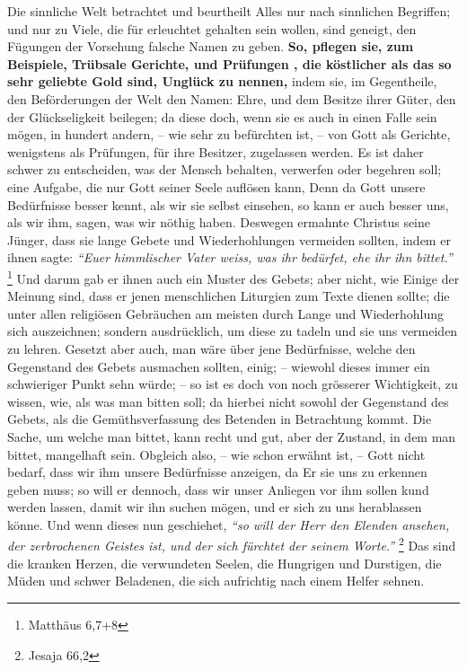 \medskip

Die sinnliche Welt betrachtet und beurtheilt Alles nur nach sinnlichen
Begriffen; und nur zu Viele, die für erleuchtet 
gehalten sein wollen, sind
geneigt, den Fügungen der Vorsehung falsche Namen zu geben. \textbf{So, pflegen
sie, zum
Beispiele, Trübsale Gerichte, und Prüfungen , die köstlicher
als das so sehr
geliebte Gold sind, Unglück  zu nennen,} indem sie, im
Gegentheile, den
Beförderungen der Welt den Namen: Ehre, und dem Besitze ihrer Güter, den der
Glückseligkeit  beilegen; da diese doch, wenn sie es auch
in einen Falle sein
mögen, in hundert andern, -- wie sehr zu befürchten ist, -- von Gott als
Gerichte, wenigstens als Prüfungen, für ihre Besitzer, zugelassen
werden. Es ist
daher schwer zu entscheiden, was der Mensch behalten, verwerfen oder begehren
soll; eine Aufgabe, die nur Gott seiner Seele auflösen
kann, Denn da Gott unsere
Bedürfnisse  besser kennt, als wir sie
selbst einsehen, so kann er auch besser
uns, als wir ihm, sagen, was wir nöthig haben. Deswegen ermahnte Christus seine
Jünger, dass sie lange Gebete und Wiederhohlungen vermeiden sollten, indem er
ihnen sagte:
\textit{"`Euer himmlischer Vater weiss, was ihr bedürfet, ehe ihr ihn
bittet."'}
\footnote{Matthäus 6,7+8}
Und darum gab er ihnen auch ein Muster des
Gebets; aber nicht, wie Einige der Meinung sind, dass er jenen menschlichen
Liturgien zum Texte dienen sollte; die unter allen religiösen Gebräuchen am
meisten durch Lange und Wiederhohlung sich auszeichnen; sondern ausdrücklich,
um diese zu tadeln und sie uns vermeiden zu lehren. Gesetzt aber auch, man wäre
über jene Bedürfnisse, welche den Gegenstand des Gebets ausmachen sollten,
einig; -- wiewohl dieses immer ein schwieriger Punkt sehn würde; -- so ist es
doch von noch grösserer Wichtigkeit, zu wissen, wie, als was man bitten soll; da
hierbei nicht sowohl der Gegenstand des Gebets, als die Gemüthsverfassung des
Betenden in Betrachtung kommt. Die Sache, um welche man bittet, kann recht und
gut, aber der Zustand, in dem man bittet, mangelhaft sein. Obgleich also, -- wie
schon erwähnt ist, -- Gott nicht bedarf, dass wir ihm unsere Bedürfnisse
anzeigen, da Er sie uns zu erkennen geben muss; so will er dennoch, dass wir
unser Anliegen vor ihm sollen kund werden lassen, damit wir ihn suchen mögen,
und er sich zu uns herablassen könne. Und wenn dieses nun geschiehet,
\textit{"`so will der Herr den Elenden ansehen, der zerbrochenen Geistes ist,
und der sich fürchtet der seinem Worte."'}
\footnote{Jesaja 66,2}
Das sind die kranken Herzen, die
verwundeten Seelen, die Hungrigen und Durstigen, die Müden und schwer Beladenen,
die sich aufrichtig nach einem Helfer sehnen.

